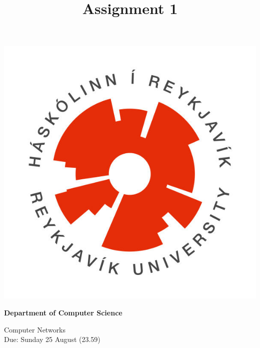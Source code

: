 \documentclass[9pt, addpoints]{exam}
\title{Assignment 1}
\begin{document}
\noindent
\begin{minipage}[l]{.11\textwidth}%
\noindent
    \includegraphics[width=\textwidth]{HR}
\end{minipage}%
\begin{minipage}[r]{.6\textwidth}%
\begin{center}
    {\large\bfseries Department of Computer Science \par
    \large Computer Networks \\[2pt]
    \large Due: Sunday 25 August (23.59)
    }
\end{center}
\end{minipage}%
%
\end{document}

